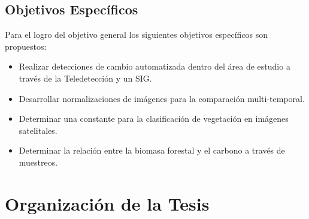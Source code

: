 \subsection{Objetivos Específicos}
Para el logro del objetivo general los siguientes objetivos espec\'ificos son propuestos:
\begin{itemize}


\item Realizar detecciones de cambio automatizada dentro del \'area de estudio a trav\'es de la Teledetecci\'on y un SIG.   
\item Desarrollar normalizaciones de im\'agenes para la comparación multi-temporal. 
\item Determinar una constante para la clasificaci\'on de vegetaci\'on en im\'agenes satelitales.
\item Determinar la relación entre la biomasa forestal y el carbono a trav\'es de muestreos.
 
    


\end{itemize}



\section{Organización de la Tesis}

